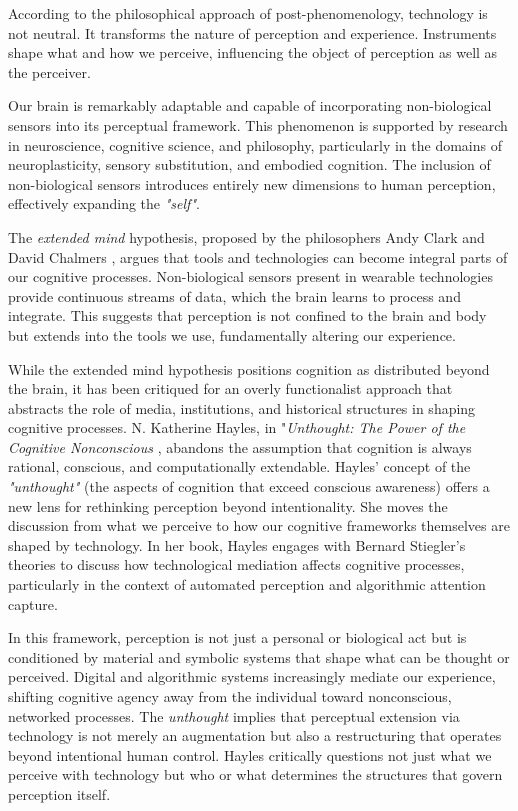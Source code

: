 According to the philosophical approach of post-phenomenology, technology is not neutral. It transforms the nature of perception and experience. Instruments shape what and how we perceive, influencing the object of perception as well as the perceiver.

Our brain is remarkably adaptable and capable of incorporating non-biological sensors into its perceptual framework. This phenomenon is supported by research in neuroscience, cognitive science, and philosophy, particularly in the domains of neuroplasticity, sensory substitution, and embodied cognition. The inclusion of non-biological sensors introduces entirely new dimensions to human perception, effectively expanding the \textit{"self"}.

The \textit{extended mind} hypothesis, proposed by the philosophers Andy Clark and David Chalmers \citep{clarkchalmers1998}, argues that tools and technologies can become integral parts of our cognitive processes. Non-biological sensors present in wearable technologies provide continuous streams of data, which the brain learns to process and integrate. This suggests that perception is not confined to the brain and body but extends into the tools we use, fundamentally altering our experience.

While the extended mind hypothesis positions cognition as distributed beyond the brain, it has been critiqued for an overly functionalist approach that abstracts the role of media, institutions, and historical structures in shaping cognitive processes. N. Katherine Hayles, in "\textit{Unthought: The Power of the Cognitive Nonconscious} \citep{hayles2017}, abandons the assumption that cognition is always rational, conscious, and computationally extendable. Hayles' concept of the \textit{"unthought"} (the aspects of cognition that exceed conscious awareness) offers a new lens for rethinking perception beyond intentionality. She moves the discussion from what we perceive to how our cognitive frameworks themselves are shaped by technology. In her book, Hayles engages with Bernard Stiegler's theories to discuss how technological mediation affects cognitive processes, particularly in the context of automated perception and algorithmic attention capture.

In this framework, perception is not just a personal or biological act but is conditioned by material and symbolic systems that shape what can be thought or perceived. Digital and algorithmic systems increasingly mediate our experience, shifting cognitive agency away from the individual toward nonconscious, networked processes. The \textit{unthought} implies that perceptual extension via technology is not merely an augmentation but also a restructuring that operates beyond intentional human control. Hayles critically questions not just what we perceive with technology but who or what determines the structures that govern perception itself.


